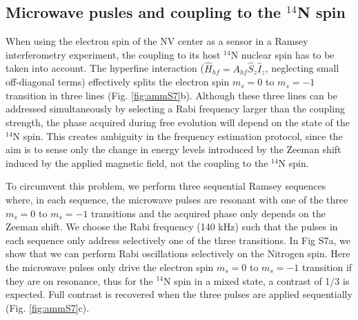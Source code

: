 \documentclass{report}
\begin{document}
\subsection{Microwave pusles and coupling to the $^{14}$N spin}
When using the electron spin of the NV center as a sensor in a Ramsey interferometry experiment, the coupling to its host $^{14}$N nuclear spin has to be taken into account. The hyperfine interaction ($\hat{H}_{hf}=A_{hf} \hat{S}_z \hat{I}_z$, neglecting small off-diagonal terms) effectively splits the electron spin $m_s = 0 $ to $m_s = -1$ transition in three lines (Fig. \ref{fig:ammS7}b).  Although these three lines can be addressed simultaneously by selecting a Rabi frequency larger than the coupling strength, the phase acquired during free evolution will depend on the state of the $^{14}$N spin. This creates ambiguity in the frequency estimation protocol, since the aim is to sense only the change in energy levels introduced by the Zeeman shift induced by the applied magnetic field, not the coupling to the $^{14}$N spin.

To circumvent this problem, we perform three sequential Ramsey sequences where, in each sequence, the microwave pulses are resonant with one of the three $m_s = 0$ to $m_s = -1$ transitions and the acquired phase only depends on the Zeeman shift. We choose the Rabi frequency (140 kHz) such that the pulses in each sequence only address selectively one of the three transitions. In Fig S7a, we show that we can perform Rabi oscillations selectively on the Nitrogen spin. Here the microwave pulses only drive the electron spin $m_s = 0$ to $m_s = -1$ transition if they are on resonance, thus for the $^{14}$N spin in a mixed state, a contrast of 1/3 is expected. Full contrast is recovered when the three pulses are applied sequentially (Fig. \ref{fig:ammS7}c).
\end{document}
